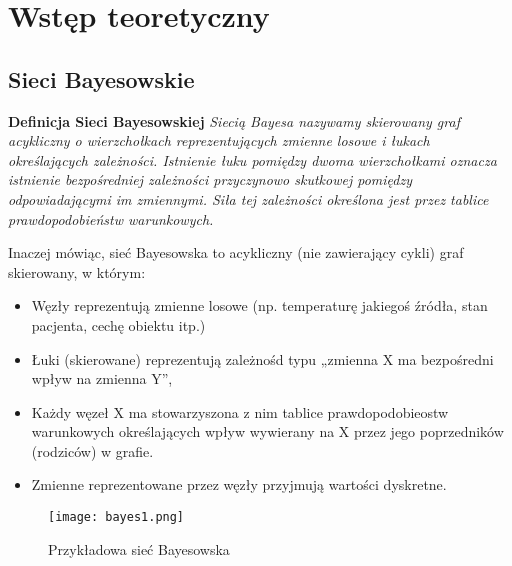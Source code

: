 

\section{Wstęp teoretyczny}

\subsection{Sieci Bayesowskie}

\textbf{Definicja Sieci Bayesowskiej}
\newline
\textit{Siecią Bayesa nazywamy skierowany graf acykliczny o wierzchołkach reprezentujących zmienne losowe i łukach określających zależności. Istnienie łuku pomiędzy dwoma wierzchołkami oznacza istnienie bezpośredniej zależności przyczynowo skutkowej pomiędzy odpowiadającymi im zmiennymi. Siła tej zależności określona jest przez tablice prawdopodobieństw warunkowych.}\newline

Inaczej mówiąc, sieć Bayesowska to acykliczny (nie zawierający cykli) graf skierowany, w którym:
\begin{itemize}
\item Węzły reprezentują zmienne losowe (np. temperaturę jakiegoś źródła, stan pacjenta, cechę obiektu itp.)
\item Łuki (skierowane) reprezentują zależnośd typu „zmienna X ma bezpośredni wpływ na zmienna Y”,
\item Każdy węzeł X ma stowarzyszona z nim tablice prawdopodobieostw warunkowych określających wpływ wywierany na X przez jego poprzedników (rodziców) w grafie.
\item Zmienne reprezentowane przez węzły przyjmują wartości dyskretne.
\end{itemize}

\begin{figure}[h!]
	\centering
	\texttt{[image: bayes1.png]}
	\label{bayes1}
	\caption{Przykładowa sieć Bayesowska}
\end{figure}

